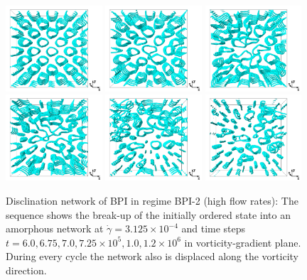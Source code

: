 \documentclass[8.5pt,twoside,twocolumn]{article}
\newcommand{\e}[1]{\times10^{#1}}
\newcommand{\gd}{\dot{\gamma}}
\begin{document}
\begin{figure}[htpb]
\includegraphics[width=0.32\textwidth]{disc-600k_run915r.png}
\includegraphics[width=0.32\textwidth]{disc-675k_run915r.png}
\includegraphics[width=0.32\textwidth]{disc-700k_run915r.png}\\
\includegraphics[width=0.32\textwidth]{disc-725k_run915r.png}
\includegraphics[width=0.32\textwidth]{disc-1000k_run915r.png}
\includegraphics[width=0.32\textwidth]{disc-1200k_run915r.png}
\caption{
Disclination network of BPI in regime BPI-2 (high flow rates):
The sequence shows the break-up of the initially ordered state into 
an amorphous network at $\gd=3.125\e{-4}$ and time steps
$t=6.0, 6.75, 7.0, 7.25 \e{5}, 1.0,1.2\e{6}$ in vorticity-gradient plane.
During every cycle the network also is displaced
along the vorticity direction.
}
\label{bp1-3-disc}
\end{figure}
\end{document}

